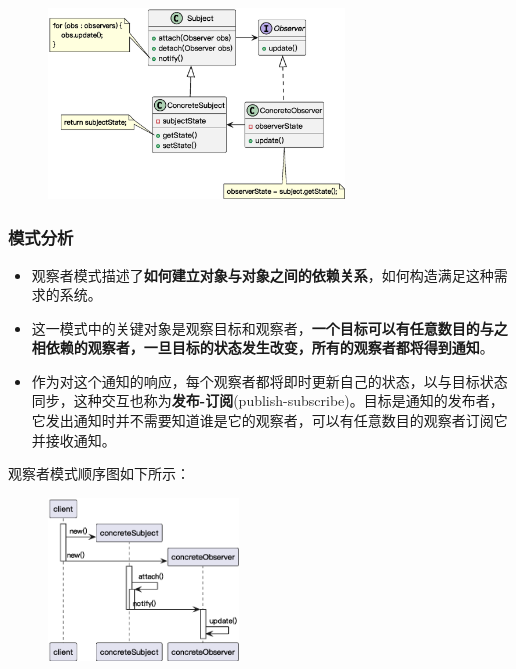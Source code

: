 \begin{figure}[H]
    \vspace{-0.5em}
	\centering
	\includegraphics[width=0.7\textwidth]{images/观察者模式结构.eps}
    \vspace{-1em}
\end{figure}

\subsubsection{模式分析}
\begin{itemize}
    \item 观察者模式描述了\textbf{如何建立对象与对象之间的依赖关系}，如何构造满足这种需求的系统。
    \item 这一模式中的关键对象是观察目标和观察者，\textbf{一个目标可以有任意数目的与之相依赖的观察者，一旦目标的状态发生改变，所有的观察者都将得到通知}。
    \item 作为对这个通知的响应，每个观察者都将即时更新自己的状态，以与目标状态同步，这种交互也称为\textbf{发布-订阅}(publish-subscribe)。目标是通知的发布者，它发出通知时并不需要知道谁是它的观察者，可以有任意数目的观察者订阅它并接收通知。
\end{itemize}

观察者模式顺序图如下所示：
\begin{figure}[H]
    \vspace{-0.5em}
	\centering
	\includegraphics[width=0.45\textwidth]{images/观察者模式顺序图.eps}
    \vspace{-1em}
\end{figure}

